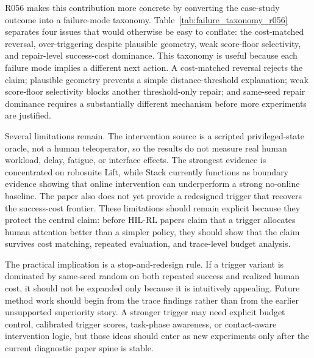 R056 makes this contribution more concrete by converting the case-study outcome into a failure-mode taxonomy. Table~\ref{tab:failure_taxonomy_r056} separates four issues that would otherwise be easy to conflate: the cost-matched reversal, over-triggering despite plausible geometry, weak score-floor selectivity, and repair-level success-cost dominance. This taxonomy is useful because each failure mode implies a different next action. A cost-matched reversal rejects the claim; plausible geometry prevents a simple distance-threshold explanation; weak score-floor selectivity blocks another threshold-only repair; and same-seed repair dominance requires a substantially different mechanism before more experiments are justified.



Several limitations remain. The intervention source is a scripted privileged-state oracle, not a human teleoperator, so the results do not measure real human workload, delay, fatigue, or interface effects. The strongest evidence is concentrated on robosuite Lift, while Stack currently functions as boundary evidence showing that online intervention can underperform a strong no-online baseline. The paper also does not yet provide a redesigned trigger that recovers the success-cost frontier. These limitations should remain explicit because they protect the central claim: before HIL-RL papers claim that a trigger allocates human attention better than a simpler policy, they should show that the claim survives cost matching, repeated evaluation, and trace-level budget analysis.

The practical implication is a stop-and-redesign rule. If a trigger variant is dominated by same-seed random on both repeated success and realized human cost, it should not be expanded only because it is intuitively appealing. Future method work should begin from the trace findings rather than from the earlier unsupported superiority story. A stronger trigger may need explicit budget control, calibrated trigger scores, task-phase awareness, or contact-aware intervention logic, but those ideas should enter as new experiments only after the current diagnostic paper spine is stable.
